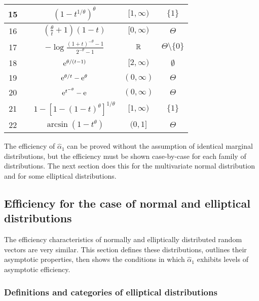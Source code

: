 \begin{table}
{\begin{tabular}{|c|c|c|c|c|}
\hline
15 & \cellcolor{lightgray} & $(1 - t^{1/\theta})^\theta$ & $[1, \infty)$ & $\{1\}$ \\[3pt]
\hline
16 & \cellcolor{lightgray} & $(\frac{\theta}{t} + 1)(1-t)$ & $[0, \infty)$ & $\Theta$ \\[3pt]
\hline
17 & \cellcolor{lightgray} & $-\log \frac{(1+t)^{-\theta}-1}{2^{-\theta} - 1}$ & $\mathbb{R}$ & $\Theta \setminus \{0\}$ \\[3pt]
\hline
18 & \cellcolor{lightgray} & $\mathrm{e}^{\theta/(t-1)}$ & $[2, \infty)$ & $\emptyset$ \\[3pt]
\hline
19 & \cellcolor{lightgray} & $\mathrm{e}^{\theta/t} - \mathrm{e}^{\theta}$ & $(0, \infty)$ & $\Theta$ \\[3pt]
\hline
20 & \cellcolor{lightgray} & $\mathrm{e}^{t^{-\theta}} - \mathrm{e}$ & $(0, \infty)$ & $\Theta$ \\[3pt]
\hline
21 & \cellcolor{lightgray} & $1 - [1 - (1-t)^\theta]^{1/\theta}$ & $[1, \infty)$ & $\{1\}$ \\[3pt]
\hline
22 & \cellcolor{lightgray} & $\arcsin(1-t^\theta)$ & $(0, 1]$ & $\Theta$ \\[3pt]
\hline
\end{tabular}}
\end{table}

The efficiency of $\hat{\alpha}_1$ can be proved without the assumption of identical marginal distributions, but the efficiency must be shown case-by-case for each family of distributions. The next section does this for the multivariate normal distribution and for some elliptical distributions. 

\subsection{Efficiency for the case of normal and elliptical distributions} \label{scn:elliptical}

The efficiency characteristics of normally and elliptically distributed random vectors are very similar. This section defines these distributions, outlines their asymptotic properties, then shows the conditions in which $\hat{\alpha}_1$ exhibits levels of asymptotic efficiency.

\subsubsection{Definitions and categories of elliptical distributions}

